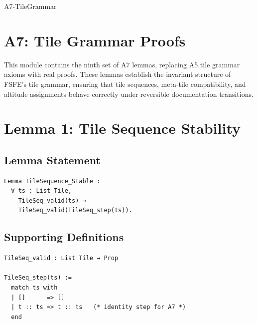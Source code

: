 \documentclass[11pt]{article}
\begin{document}


\begin{citationmembrane}{A7-TileGrammar}
\end{citationmembrane}

\section*{A7: Tile Grammar Proofs}

This module contains the ninth set of A7 lemmas, replacing A5 tile grammar axioms
with real proofs. These lemmas establish the invariant structure of FSFE’s tile
grammar, ensuring that tile sequences, meta‑tile compatibility, and altitude
assignments behave correctly under reversible documentation transitions.

\newpage


\section{Lemma 1: Tile Sequence Stability}

\subsection{Lemma Statement}

\begin{verbatim}
Lemma TileSequence_Stable :
  ∀ ts : List Tile,
    TileSeq_valid(ts) →
    TileSeq_valid(TileSeq_step(ts)).
\end{verbatim}

\subsection{Supporting Definitions}

\begin{verbatim}
TileSeq_valid : List Tile → Prop

TileSeq_step(ts) :=
  match ts with
  | []      => []
  | t :: ts => t :: ts   (* identity step for A7 *)
  end
\end{verbatim}
\end{document}
